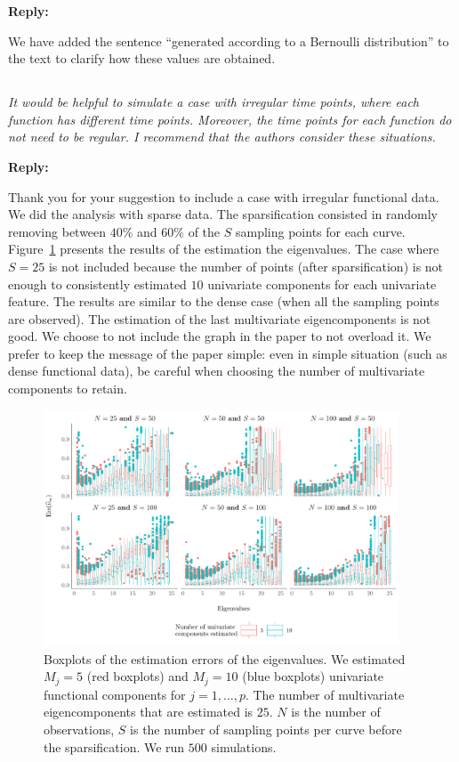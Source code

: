 \documentclass[12pt,a4paper]{article}
\newcommand{\comments}[1]{\subsection{}
\begin{mdframed}[style=comments] 
        \textit{#1}
\end{mdframed}}
\newcommand{\reply}[1]{
    \noindent\textbf{Reply:}

\begin{mdframed}[style=replies] 
    #1
\end{mdframed}
}
\begin{document}
\reply{We have added the sentence ``generated according to a Bernoulli distribution'' to the text to clarify how these values are obtained.}


\comments{It would be helpful to simulate a case with irregular time points, where each function has different time points. Moreover, the time points for each function do not need to be regular. I recommend that the authors consider these situations.}

\reply{Thank you for your suggestion to include a case with irregular functional data. We did the analysis with sparse data. The sparsification consisted in randomly removing between $40\%$ and $60\%$ of the $S$ sampling points for each curve. Figure~\ref{fig:ncomp} presents the results of the estimation the eigenvalues. The case where $S = 25$ is not included because the number of points (after sparsification) is not enough to consistently estimated $10$ univariate components for each univariate feature. The results are similar to the dense case (when all the sampling points are observed). The estimation of the last multivariate eigencomponents is not good. We choose to not include the graph in the paper to not overload it. We prefer to keep the message of the paper simple: even in simple situation (such as dense functional data), be careful when choosing the number of multivariate components to retain.}
\begin{figure}
     \centering
    \includegraphics[width=0.94\textwidth]{ncomp.pdf}
    \caption{Boxplots of the estimation errors of the eigenvalues. We estimated $M_j = 5$ (red boxplots) and $M_j = 10$ (blue boxplots) univariate functional components for $j = 1, \dots, p$. The number of multivariate eigencomponents that are estimated is $25$. $N$ is the number of observations, $S$ is the number of sampling points per curve before the sparsification. We run $500$ simulations.}
    \label{fig:ncomp}
\end{figure}
\end{document}
